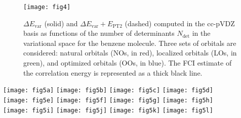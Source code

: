 \documentclass[aip,jcp,reprint,noshowkeys,superscriptaddress,floatfix]{revtex4-1}
\newcommand{\Ndet}{N_\text{det}}
\newcommand{\Evar}{E_\text{var}}
\newcommand{\EPT}{E_\text{PT2}}
\begin{document}
\begin{figure}
	\texttt{[image: fig4]}
	\caption{$\Delta \Evar$ (solid) and $\Delta \Evar + \EPT$ (dashed) computed in the cc-pVDZ basis as functions of the number of determinants $\Ndet$ in the variational space for the benzene molecule.
	Three sets of orbitals are considered: natural orbitals (NOs, in red), localized orbitals (LOs, in green), and optimized orbitals (OOs, in blue).
	The FCI estimate of the correlation energy is represented as a thick black line.
	\label{fig:BenzenevsNdet}}
\end{figure}

\begin{figure*}
	\texttt{[image: fig5a]}
	\texttt{[image: fig5b]}
	\texttt{[image: fig5c]}
	\texttt{[image: fig5d]}
	\\
	\texttt{[image: fig5e]}
	\texttt{[image: fig5f]}
	\texttt{[image: fig5g]}
	\texttt{[image: fig5h]}
	\\
	\texttt{[image: fig5i]}
	\texttt{[image: fig5j]}
	\texttt{[image: fig5k]}
	\texttt{[image: fig5l]}
	\caption{Convergence of the correlation energy (in \si{\milli\hartree}) computed in the cc-pVDZ basis as a function of the formal computational scaling for the twelve cyclic molecules represented in Fig.~\ref{fig:mol}.
	Three series of methods are considered: i) MP2, MP3, MP4, and MP5 (blue), ii) CC2, CC3, and CC4 (green), and iii) CCSD, CCSDT, CCSDTQ (red).
	The FCI estimate of the correlation energy is represented as a black line.
	\label{fig:MPCC}}
\end{figure*}
\end{document}
